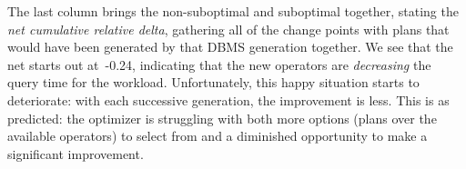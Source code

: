 \documentclass[prodmode,acmtods]{acmsmall}
\begin{document}
The last column brings the non-suboptimal and suboptimal together, stating
the {\em net cumulative relative delta}, gathering all of the change points
with plans that would have been generated by that DBMS generation
together. We see that the net starts out \hbox{at -0.24}, indicating that the new
operators are {\em decreasing} the query time for the
workload. Unfortunately, this happy situation starts to deteriorate: with
each successive generation, the improvement is less. This is as predicted:
the optimizer is struggling with both more options (plans over the available
operators) to select from and a diminished opportunity to make a significant
improvement.

\begin{table}[t]
\end{table}
\end{document}

